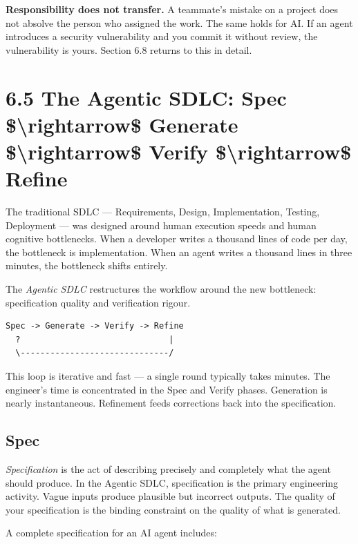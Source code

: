 \documentclass[11pt,a4paper]{book}
\begin{document}
\textbf{Responsibility does not transfer.} A teammate's mistake on a project does not absolve the person who assigned the work. The same holds for AI. If an agent introduces a security vulnerability and you commit it without review, the vulnerability is yours. Section 6.8 returns to this in detail.

\medskip

\section{6.5 The Agentic SDLC: Spec \$\textbackslash{}rightarrow\$ Generate \$\textbackslash{}rightarrow\$ Verify \$\textbackslash{}rightarrow\$ Refine}

The traditional SDLC --- Requirements, Design, Implementation, Testing, Deployment --- was designed around human execution speeds and human cognitive bottlenecks. When a developer writes a thousand lines of code per day, the bottleneck is implementation. When an agent writes a thousand lines in three minutes, the bottleneck shifts entirely.

The \textit{Agentic SDLC} restructures the workflow around the new bottleneck: specification quality and verification rigour.

\begin{lstlisting}
Spec -> Generate -> Verify -> Refine
  ?                              |
  \------------------------------/
\end{lstlisting}

This loop is iterative and fast --- a single round typically takes minutes. The engineer's time is concentrated in the Spec and Verify phases. Generation is nearly instantaneous. Refinement feeds corrections back into the specification.

\subsection{Spec}

\textit{Specification} is the act of describing precisely and completely what the agent should produce. In the Agentic SDLC, specification is the primary engineering activity. Vague inputs produce plausible but incorrect outputs. The quality of your specification is the binding constraint on the quality of what is generated.

A complete specification for an AI agent includes:
\end{document}
